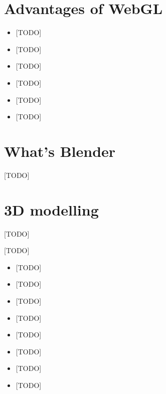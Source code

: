\documentclass[a4paper,12pt,oneside]{sphinxmanual}
\begin{document}
\index{{[}TODO{]}!{[}TODO{]}}

\section{Advantages of WebGL}
\label{about:about-webgl-benefits}\label{about:index-5}\label{about:id8}\begin{itemize}
\item {} 
{[}TODO{]}

\item {} 
{[}TODO{]}

\item {} 
{[}TODO{]}

\item {} 
{[}TODO{]}

\item {} 
{[}TODO{]}

\item {} 
{[}TODO{]}

\end{itemize}

\index{{[}TODO{]}}

\section{What's Blender}
\label{about:index-6}\label{about:about-blender}\label{about:blender}
{[}TODO{]}


\section{3D modelling}
\label{about:about-modelling}\label{about:index-7}\label{about:d}
{[}TODO{]}

{[}TODO{]}
\begin{itemize}
\item {} 
{[}TODO{]}

\item {} 
{[}TODO{]}

\item {} 
{[}TODO{]}

\item {} 
{[}TODO{]}

\item {} 
{[}TODO{]}

\item {} 
{[}TODO{]}

\item {} 
{[}TODO{]}

\item {} 
{[}TODO{]}

\end{itemize}
\end{document}
